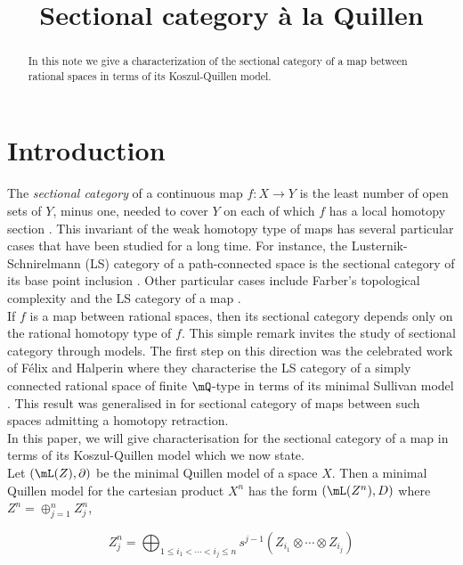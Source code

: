 
\title{Sectional category \`a la Quillen}
\begin{abstract}
In this note we give a characterization of the sectional category of a map between rational spaces in terms of its Koszul-Quillen model.
\end{abstract}
\maketitle

\section*{Introduction}\label{sect:intro}
The \emph{sectional category} of a continuous map $f\colon X\to Y$ is the least number of open sets of $Y$, minus one, needed to cover $Y$ on each of which $f$ has a local homotopy section \cite{Schwarz66}. This invariant of the weak homotopy type of maps has several particular cases that have been studied for a long time. For instance, the Lusternik-Schnirelmann (LS) category of a path-connected space is the sectional category of its base point inclusion \cite{LS}. Other particular cases include Farber's topological complexity \cite{F} and the LS category of a map \cite{BG,Fox}.\\

If $f$ is a map between rational spaces, then its sectional category depends only on the rational homotopy type of $f$. This simple remark invites the study of sectional category through models. The first step on this direction was the celebrated work of F\'elix and Halperin \cite{FH} where they characterise the LS category of a simply connected rational space of finite $\mQ$-type in terms of its minimal Sullivan model \cite{FHT,S}. This result was generalised in \cite{C} for sectional category of maps between such spaces admitting a homotopy retraction.\\

In this paper, we will give characterisation for the sectional category of a map in terms of its Koszul-Quillen model which we now state.\\

Let $(\mL (Z),\partial)$ be the minimal Quillen model of a space $X$. Then a minimal Quillen model for the cartesian product $X^n$ has the form $(\mL (Z^n),D)$ where $Z^n=\oplus_{j=1}^nZ^n_j$,  

\begin{equation}\label{equa:DefinZi}
	Z^n_j=\bigoplus_{1\le i_1<\cdots<i_j\le n } s^{j-1}(Z_{i_1}\otimes\cdots \otimes Z_{i_j})
\end{equation}	
	 
